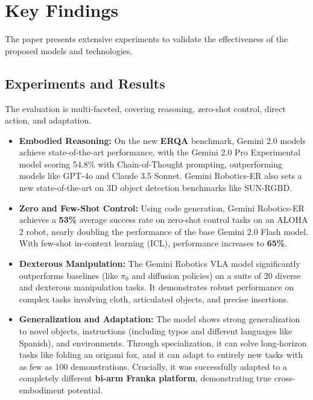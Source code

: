 \documentclass{article}
\begin{document}
\section{Key Findings}
The paper presents extensive experiments to validate the effectiveness of the proposed models and technologies.

\subsection{Experiments and Results}
The evaluation is multi-faceted, covering reasoning, zero-shot control, direct action, and adaptation.

\begin{itemize}
    \item \textbf{Embodied Reasoning:} On the new \textbf{ERQA} benchmark, Gemini 2.0 models achieve state-of-the-art performance, with the Gemini 2.0 Pro Experimental model scoring 54.8\% with Chain-of-Thought prompting, outperforming models like GPT-4o and Claude 3.5 Sonnet. Gemini Robotics-ER also sets a new state-of-the-art on 3D object detection benchmarks like SUN-RGBD.

    \item \textbf{Zero and Few-Shot Control:} Using code generation, Gemini Robotics-ER achieves a \textbf{53\%} average success rate on zero-shot control tasks on an ALOHA 2 robot, nearly doubling the performance of the base Gemini 2.0 Flash model. With few-shot in-context learning (ICL), performance increases to \textbf{65\%}.

    \item \textbf{Dexterous Manipulation:} The Gemini Robotics VLA model significantly outperforms baselines (like $\pi_0$ and diffusion policies) on a suite of 20 diverse and dexterous manipulation tasks. It demonstrates robust performance on complex tasks involving cloth, articulated objects, and precise insertions.

    \item \textbf{Generalization and Adaptation:} The model shows strong generalization to novel objects, instructions (including typos and different languages like Spanish), and environments. Through specialization, it can solve long-horizon tasks like folding an origami fox, and it can adapt to entirely new tasks with as few as 100 demonstrations. Crucially, it was successfully adapted to a completely different \textbf{bi-arm Franka platform}, demonstrating true cross-embodiment potential.
\end{itemize}
\end{document}

